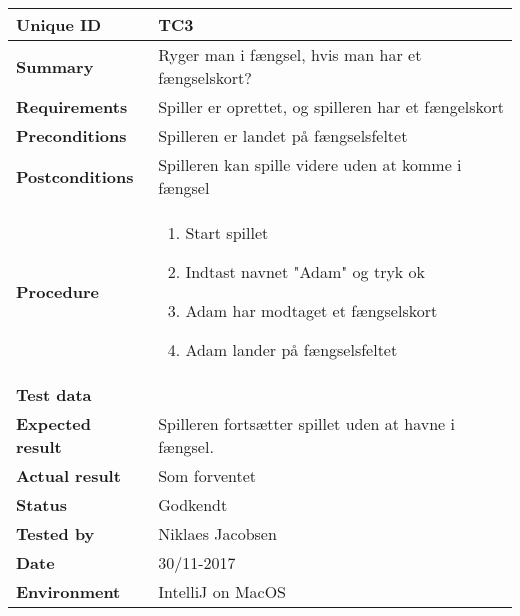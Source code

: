 \begin{table}[H]
    \begin{center}
        \begin{tabular}{|l|p{8cm}|}
            \hline
            \textbf{Unique ID} & TC3 \\
            \hline
            \textbf{Summary} & Ryger man i fængsel, hvis man har et fængselskort? \\
            \hline
            \textbf{Requirements} & Spiller er oprettet, og spilleren har et fængelskort\\
            \hline
            \textbf{Preconditions} & Spilleren er landet på fængselsfeltet\\
            \hline
            \textbf{Postconditions} & Spilleren kan spille videre uden at komme i fængsel\\
            \hline
            \textbf{Procedure} & \begin{enumerate}
                \setlength\itemsep{0ex}
                \item Start spillet
                \item Indtast navnet "Adam" og tryk ok
                \item Adam har modtaget et fængselskort
                \item Adam lander på fængselsfeltet
            \end{enumerate} \\
            \hline
            \textbf{Test data} & \\
            \hline
            \textbf{Expected result} & Spilleren fortsætter spillet uden at havne i fængsel. \\
            \hline
            \textbf{Actual result} & Som forventet \\
            \hline
            \textbf{Status} & Godkendt \\
            \hline
            \textbf{Tested by} & Niklaes Jacobsen \\
            \hline
            \textbf{Date} & 30/11-2017 \\
            \hline
            \textbf{Environment} & IntelliJ on MacOS \\
            \hline
        \end{tabular}
    \end{center}
\end{table}

